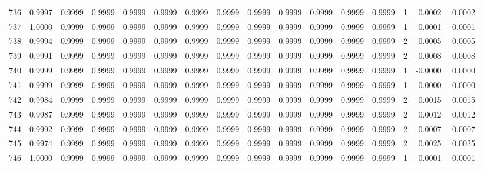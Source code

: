 \begin{tabular}{lrrrrrrrrrrrrrrr}
736 &      0.9997 &  0.9999 &  0.9999 &  0.9999 &  0.9999 &  0.9999 &  0.9999 &  0.9999 &  0.9999 &  0.9999 &   0.9999 &     0.9999 &      1 &                    0.0002 &                     0.0002 \\
737 &      1.0000 &  0.9999 &  0.9999 &  0.9999 &  0.9999 &  0.9999 &  0.9999 &  0.9999 &  0.9999 &  0.9999 &   0.9999 &     0.9999 &      1 &                   -0.0001 &                    -0.0001 \\
738 &      0.9994 &  0.9999 &  0.9999 &  0.9999 &  0.9999 &  0.9999 &  0.9999 &  0.9999 &  0.9999 &  0.9999 &   0.9999 &     0.9999 &      2 &                    0.0005 &                     0.0005 \\
739 &      0.9991 &  0.9999 &  0.9999 &  0.9999 &  0.9999 &  0.9999 &  0.9999 &  0.9999 &  0.9999 &  0.9999 &   0.9999 &     0.9999 &      2 &                    0.0008 &                     0.0008 \\
740 &      0.9999 &  0.9999 &  0.9999 &  0.9999 &  0.9999 &  0.9999 &  0.9999 &  0.9999 &  0.9999 &  0.9999 &   0.9999 &     0.9999 &      1 &                   -0.0000 &                     0.0000 \\
741 &      0.9999 &  0.9999 &  0.9999 &  0.9999 &  0.9999 &  0.9999 &  0.9999 &  0.9999 &  0.9999 &  0.9999 &   0.9999 &     0.9999 &      1 &                   -0.0000 &                     0.0000 \\
742 &      0.9984 &  0.9999 &  0.9999 &  0.9999 &  0.9999 &  0.9999 &  0.9999 &  0.9999 &  0.9999 &  0.9999 &   0.9999 &     0.9999 &      2 &                    0.0015 &                     0.0015 \\
743 &      0.9987 &  0.9999 &  0.9999 &  0.9999 &  0.9999 &  0.9999 &  0.9999 &  0.9999 &  0.9999 &  0.9999 &   0.9999 &     0.9999 &      2 &                    0.0012 &                     0.0012 \\
744 &      0.9992 &  0.9999 &  0.9999 &  0.9999 &  0.9999 &  0.9999 &  0.9999 &  0.9999 &  0.9999 &  0.9999 &   0.9999 &     0.9999 &      2 &                    0.0007 &                     0.0007 \\
745 &      0.9974 &  0.9999 &  0.9999 &  0.9999 &  0.9999 &  0.9999 &  0.9999 &  0.9999 &  0.9999 &  0.9999 &   0.9999 &     0.9999 &      2 &                    0.0025 &                     0.0025 \\
746 &      1.0000 &  0.9999 &  0.9999 &  0.9999 &  0.9999 &  0.9999 &  0.9999 &  0.9999 &  0.9999 &  0.9999 &   0.9999 &     0.9999 &      1 &                   -0.0001 &                    -0.0001 \\

\end{tabular}
